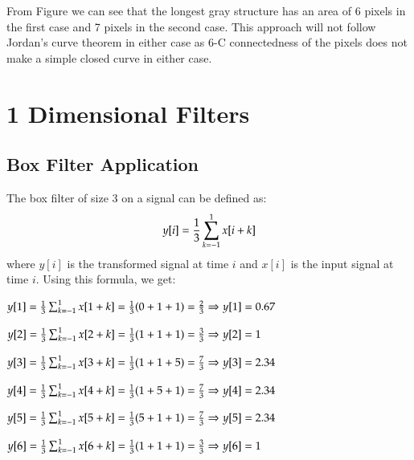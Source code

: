 \documentclass[a4paper,11pt]{article}
\begin{document}
\newline
From Figure %
we can see that the longest gray structure has an area of 6 pixels in the first case and 7 pixels in the second case.
\newline
This approach will not follow Jordan's curve theorem in either case as 6-C connectedness of the pixels does not make a simple closed curve in either case.





\section{1 Dimensional Filters}
\subsection{Box Filter Application}

The box filter of size 3 on a signal can be defined as:
$${y[i] = \frac{1}{3} \large\sum _{k=-1}^{1} x[i+k]}$$
\newline
where $y[i]$ is the transformed signal at time $i$ and $x[i]$ is the input signal at time $i$.
\newline
Using this formula, we get:\newline

${y[1] = \frac{1}{3} \large\sum _{k=-1}^{1} x[1+k] = \frac{1}{3} (0+1+1) = \frac{2}{3} \Rightarrow y[1]=  0.67 }$\newline

${ y[2] = \frac{1}{3} \large\sum _{k=-1}^{1} x[2+k] = \frac{1}{3} (1+1+1) = \frac{3}{3} \Rightarrow y[2]=  1 }$ \newline

${ y[3] = \frac{1}{3} \large\sum _{k=-1}^{1} x[3+k] = \frac{1}{3} (1+1+5) = \frac{7}{3} \Rightarrow y[3]=  2.34 }$ \newline

${ y[4] = \frac{1}{3} \large\sum _{k=-1}^{1} x[4+k] = \frac{1}{3} (1+5+1) = \frac{7}{3} \Rightarrow y[4]=  2.34 }$ \newline

${ y[5] = \frac{1}{3} \large\sum _{k=-1}^{1} x[5+k] = \frac{1}{3} (5+1+1) = \frac{7}{3} \Rightarrow y[5]=  2.34 }$ \newline

${ y[6] = \frac{1}{3} \large\sum _{k=-1}^{1} x[6+k] = \frac{1}{3} (1+1+1) = \frac{3}{3} \Rightarrow y[6]=  1 }$ \newline
\end{document}
